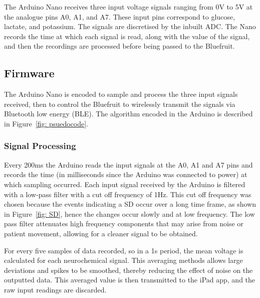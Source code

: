 The Arduino Nano receives three input voltage signals ranging from 0V to 5V at the analogue pins A0, A1, and A7. These input pins correspond to glucose, lactate, and potassium. The signals are discretised by the inbuilt ADC. The Nano records the time at which each signal is read, along with the value of the signal, and then the recordings are processed before being passed to the Bluefruit.



\subsection{Firmware}
The Arduino Nano is encoded to sample and process the three input signals received, then to control the Bluefruit to wirelessly transmit the signals via Bluetooth low energy (BLE). The algorithm encoded in the Arduino is described in Figure~\ref{fig: psuedocode}.


\subsubsection{Signal Processing}
Every 200ms the Arduino reads the input signals at the A0, A1 and A7 pins and records the time (in milliseconds since the Arduino was connected to power) at which sampling occurred. Each input signal received by the Arduino is filtered with a low-pass filter with a cut off frequency of 1Hz. This cut off frequency was chosen because the events indicating a SD occur over a long time frame, as shown in Figure~\ref{fig: SD}, hence the changes occur slowly and at low frequency. The low pass filter attenuates high frequency components that may arise from noise or patient movement, allowing for a cleaner signal to be obtained.

For every five samples of data recorded, so in a 1s period, the mean voltage is calculated for each neurochemical signal. This averaging methods allows large deviations and spikes to be smoothed, thereby reducing the effect of noise on the outputted data. This averaged value is then transmitted to the iPad app, and the raw input readings are discarded.

